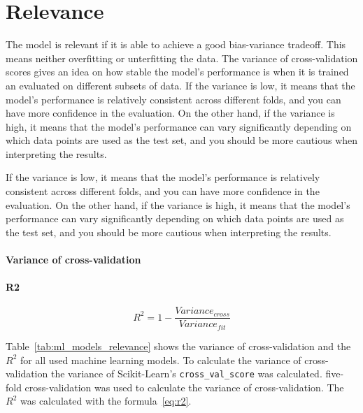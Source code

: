 \section{Relevance}


The model is relevant if it is able to achieve a good bias-variance tradeoff. This means neither overfitting or unterfitting the data.
The variance of cross-validation scores gives an idea on how stable the model's performance is when it is trained an evaluated on different subsets of data.
If the variance is low, it means that the model's performance is relatively consistent across different folds, and you can have more confidence in the evaluation. On the other hand, if the variance is high, it means that the model's performance can vary significantly depending on which data points are used as the test set, and you should be more cautious when interpreting the results.

If the variance is low, it means that the model's performance is relatively consistent across different folds, and you can have more confidence in the evaluation. On the other hand, if the variance is high, it means that the model's performance can vary significantly depending on which data points are used as the test set, and you should be more cautious when interpreting the results.

\paragraph*{Variance of cross-validation}




\paragraph*{R2}

\begin{equation}
    \label{eq:r2}
    R^2 = 1 - \frac{Variance_{cross}}{Variance_{fit}}
\end{equation}

Table~\ref*{tab:ml_models_relevance} shows the variance of cross-validation and the $R^2$ for all used machine learning models.
To calculate the variance of cross-validation  the variance of Scikit-Learn's \texttt{cross\_val\_score} was calculated. five-fold cross-validation was used to calculate the variance of cross-validation. The $R^2$ was calculated with the formula~\ref{eq:r2}.

